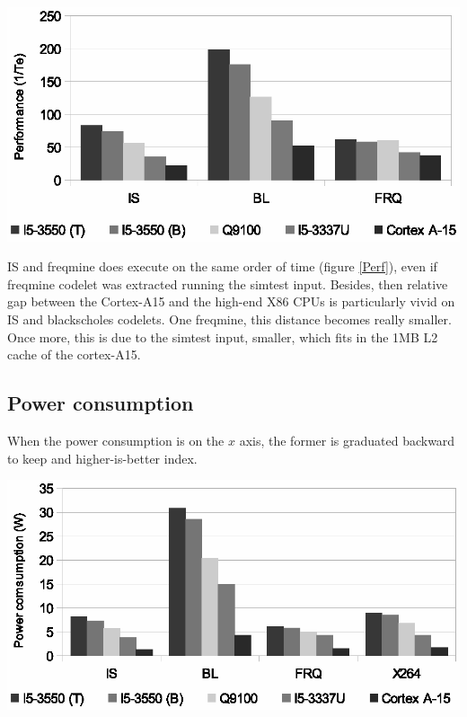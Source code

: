 \documentclass{article}
\newenvironment{Figure}
  {\par\medskip\noindent\center\minipage{0.9\linewidth}}
  {\endminipage\par\bigskip\medskip}
\begin{document}
\begin{multicols}{2}
\begin{Figure}
\centering
\includegraphics[width=\linewidth]{Performance.eps}
\end{Figure}


IS and freqmine does execute on the same order of time (figure \ref{Perf}), even if freqmine codelet was extracted running the simtest input. Besides, then relative gap between the Cortex-A15 and the high-end X86 CPUs is particularly vivid on IS and blackscholes codelets. One freqmine, this distance becomes really smaller. Once more, this is due to the simtest input, smaller, which fits in the 1MB L2 cache of the cortex-A15.



\subsection{Power consumption}
When the power consumption is on the $x$ axis, the former is graduated backward to keep and higher-is-better index.


\begin{Figure}
\centering
\includegraphics[width=\linewidth]{Power_consumption.eps}
\end{Figure}


\end{multicols}
\end{document}
